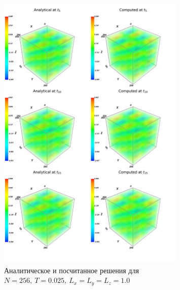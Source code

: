 \documentclass[oneside, final, 12pt]{extarticle}
\begin{document}
\begin{figure}[H]
    \centering
    \includegraphics[width=0.8\textwidth]{cmp.png}
    \caption{Аналитическое и посчитанное решения для $ N = 256, \: T = 0.025, \: L_x = L_y = L_z = 1.0 $}
\end{figure}
\end{document}
